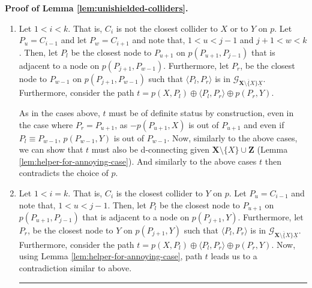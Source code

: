 \documentclass[11pt]{article}
\newcommand{\BlackBox}{\rule{1.5ex}{1.5ex}}  %
\newcommand{\mb}[1]{\mathbf{#1}}
\newcommand{\g}[1][G]{\mathcal{#1}}
\newenvironment{proofofnoqed}[1][]{\noindent \textbf{Proof of #1.}}{}
\begin{document}
\begin{proofofnoqed}[Lemma \ref{lem:unishielded-colliders}]
\begin{enumerate}[label = (\roman*)]
\begin{enumerate}[label = (\arabic*)]
            Note that $t$ must be of definite status by construction, even in the case where $P_r \equiv P_{w-1}$, simply because $p(P_{w-1}, Y)$ is out of $P_{w-1}$. Furthermore, since both $P_l$ and $P_r$ are non-colliders on $p$, we have that $t$ is d-connecting given $\mb{X} \setminus \{X\} \cup \mb{Z}$ by Lemma \ref{lem:helper-for-annoying-case}. Then if $l =1$, $t$ starts with an edge into $X$ (by case \ref{unishielded-coll-case1}) and has one fewer collider than $p$, which leads us to a contradiction. Otherwise,  $l \neq 1$, and $t$ starts with the same edge as $p$, but $t$ either has fewer colliders than $p$, or the same number of colliders as $p$ but fewer edges than $p$ which gives us the desired contradiction. 

            \item\label{case3:unshielded-collider}
            Let $1 < i < k$. That is, $C_i$ is not the closest collider to $X$ or to $Y$ on $p$. Let $P_u = C_{i-1}$ and let $P_w = C_{i+1}$ and note that, $1 < u < j-1$ and $j +1< w <k$. Then, let $P_l$ be the closest node to $P_{u+1}$ on $p(P_{u+1},P_{j-1})$ that is adjacent to a node on $p(P_{j+1},P_{w-1})$. Furthermore, let $P_r$, be the closest node to $P_{w-1}$ on $p(P_{j+1}, P_{w-1})$ such that $\langle P_l, P_{r} \rangle$ is in $\g_{\overline{\mb{X} \setminus \{X\}} \underline{X}}$. Furthermore, consider the path $t = p(X,P_l) \oplus \langle P_l, P_r \rangle \oplus p(P_r, Y)$. 

            As in the cases above, $t$ must be of definite status by construction, even in the case where $P_r = P_{u+1}$, as $-p(P_{u+1}, X)$ is out of $P_{u+1}$ and even if $P_l \equiv P_{w-1}$, $p(P_{w-1}, Y)$ is out of $P_{w-1}$. Now, similarly to the above cases, we can show that $t$ must also be d-connecting given $\mb{X} \setminus \{X\} \cup \mb{Z}$ (Lemma \ref{lem:helper-for-annoying-case}). And similarly to the above cases $t$ then contradicts the choice of $p$.

            \item\label{case4:unshielded-collider}
            Let $1 < i = k$. That is, $C_i$ is the closest collider to $Y$ on $p$. Let $P_u = C_{i-1}$ and note that, $1 < u < j-1$. Then, let $P_l$ be the closest node to $P_{u+1}$ on $p(P_{u+1},P_{j-1})$ that is adjacent to a node on $p(P_{j+1},Y)$. Furthermore, let $P_r$, be the closest node to $Y$ on $p(P_{j+1}, Y)$ such that $\langle P_l, P_{r} \rangle$ is in $\g_{\overline{\mb{X} \setminus \{X\}} \underline{X}}$. Furthermore, consider the path $t = p(X,P_l) \oplus \langle P_l, P_r \rangle \oplus p(P_r, Y)$. Now, using Lemma \ref{lem:helper-for-annoying-case}, path $t$ leads us to a contradiction similar to above. \hfill \BlackBox
        \end{enumerate}
    \end{enumerate}
\end{proofofnoqed}
\end{document}
